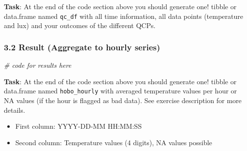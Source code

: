 \documentclass[
]{article}
\newenvironment{Shaded}{\begin{snugshade}}{\end{snugshade}}
\newcommand{\CommentTok}[1]{\textcolor[rgb]{0.56,0.35,0.01}{\textit{#1}}}
\begin{document}
\textbf{Task}: At the end of the code section above you should generate
one! tibble or data.frame named \texttt{qc\_df} with all time
information, all data points (temperature and lux) and your outcomes of
the different QCPs.

\hypertarget{result-aggregate-to-hourly-series}{%
\subsubsection{3.2 Result (Aggregate to hourly
series)}\label{result-aggregate-to-hourly-series}}

\begin{Shaded}
\begin{Highlighting}[]
\CommentTok{\# code for results here}
\end{Highlighting}
\end{Shaded}

\textbf{Task}: At the end of the code section above you should generate
one! tibble or data.frame named \texttt{hobo\_hourly} with averaged
temperature values per hour or NA values (if the hour is flagged as bad
data). See exercise description for more details.

\begin{itemize}
\item
  First column: YYYY-DD-MM HH:MM:SS
\item
  Second column: Temperature values (4 digits), NA values possible
\end{itemize}
\end{document}
